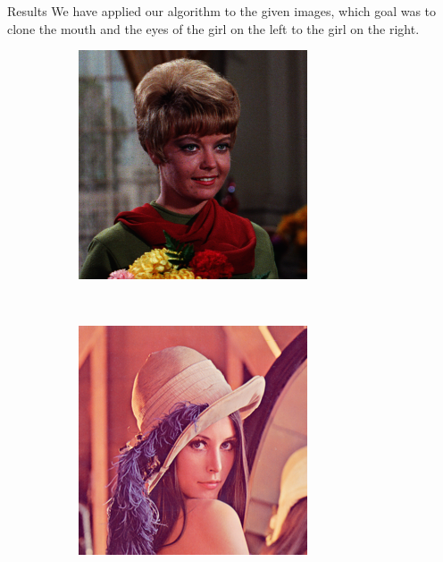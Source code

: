 \documentclass[11pt]{beamer}
\begin{document}
\begin{frame}{Results}
We have applied our algorithm to the given images, which goal was to clone the mouth and the eyes of the girl on the left to the girl on the right.
\begin{figure}
    \centering
    \begin{subfigure}[b]{0.36\textwidth}
        \includegraphics[width=\textwidth]{girl}

    \end{subfigure}
    ~ 
        \begin{subfigure}[b]{0.4\textwidth}
        \includegraphics[width=\textwidth]{lena}

    \end{subfigure}

\end{figure}
\end{frame}
\end{document}
